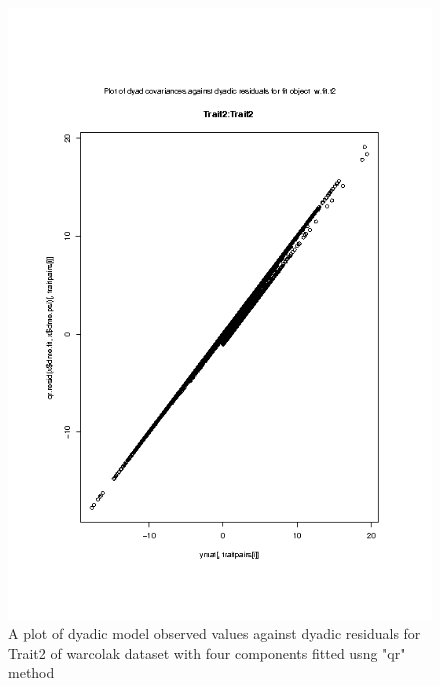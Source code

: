 %

\begin{figure}[h]
  \centering
  \includegraphics[width=1.1\textwidth]{Rplot004.png}
  \caption{A plot of dyadic model observed values against dyadic residuals
     for Trait2 of warcolak dataset with four components fitted usng "qr" method}
  \label{fig:4}
\end{figure}

%

